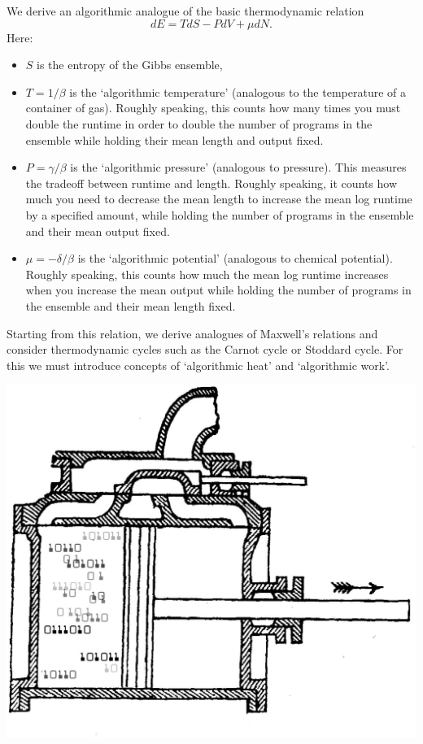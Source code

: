 \documentclass[12pt,twoside,openright]{report}
\begin{document}
We derive an algorithmic analogue of the basic thermodynamic relation
\[          dE = T dS - P dV + \mu dN . \]
Here:
\begin{itemize}
\item 
$S$ is the entropy of the Gibbs ensemble,
\item
$T = 1/\beta$ is the `algorithmic temperature' (analogous to the temperature of a container of gas).  Roughly speaking, this counts how many times you must double the runtime in order to double the number of programs in the ensemble while holding their mean length and output fixed.
\item
$P = \gamma/\beta$ is the `algorithmic pressure' (analogous to pressure).  This measures the tradeoff between runtime and length. Roughly speaking, it counts how much you need to decrease the mean length to increase the mean log runtime by a specified amount, while holding the number of programs in the ensemble and their mean output fixed.
\item
$\mu = -\delta/\beta$ is the `algorithmic potential' (analogous to chemical potential).  Roughly speaking, this counts how much the mean log runtime increases when you increase the mean output while holding the number of programs in the ensemble and their mean length fixed.
\end{itemize}

Starting from this relation, we derive analogues of Maxwell's relations and consider thermodynamic cycles such as the Carnot cycle or Stoddard cycle.  For this we must introduce concepts of `algorithmic heat' and `algorithmic work'.

\begin{center}
\includegraphics[scale=0.15, angle=0.3]{piston.eps}
\end{center}
\end{document}
